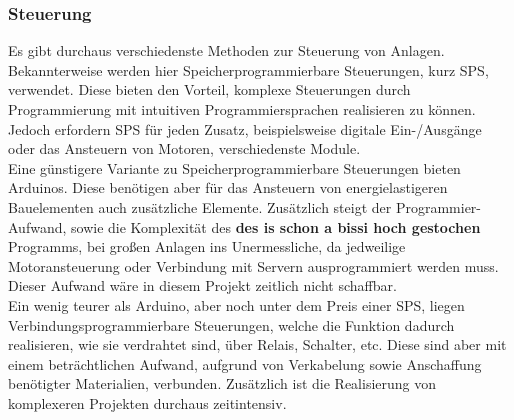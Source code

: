 \subsubsection{Steuerung}
Es gibt durchaus verschiedenste Methoden zur Steuerung von Anlagen. Bekannterweise werden hier Speicherprogrammierbare Steuerungen, kurz SPS, verwendet. Diese bieten den Vorteil, komplexe Steuerungen durch Programmierung mit intuitiven Programmiersprachen realisieren zu können. Jedoch erfordern SPS für jeden Zusatz, beispielsweise digitale Ein-/Ausgänge oder das Ansteuern von Motoren, verschiedenste Module. \\
Eine günstigere Variante zu Speicherprogrammierbare Steuerungen bieten Arduinos. Diese benötigen aber für das Ansteuern von energielastigeren Bauelementen auch zusätzliche Elemente. Zusätzlich steigt der Programmier-Aufwand, sowie die Komplexität des \textbf{des is schon a bissi hoch gestochen} Programms, bei großen Anlagen ins Unermessliche, da jedweilige Motoransteuerung oder Verbindung mit Servern ausprogrammiert werden muss. Dieser Aufwand wäre in diesem Projekt zeitlich nicht schaffbar.\\
Ein wenig teurer als Arduino, aber noch unter dem Preis einer SPS, liegen Verbindungsprogrammierbare Steuerungen, welche die Funktion dadurch realisieren, wie sie verdrahtet sind, über Relais, Schalter, etc. Diese sind aber mit einem beträchtlichen Aufwand, aufgrund von Verkabelung sowie Anschaffung benötigter Materialien, verbunden. Zusätzlich ist die Realisierung von komplexeren Projekten durchaus zeitintensiv. 


